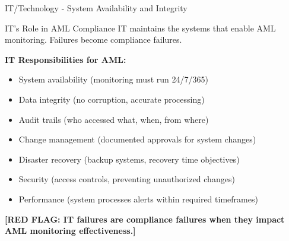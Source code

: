 \documentclass[11pt,a4paper]{beamer}
\newcommand{\redflag}[1]{\textcolor{red!80!black}{\textbf{[RED FLAG: #1]}}}
\begin{document}
	\begin{frame}{IT/Technology - System Availability and Integrity}
		\begin{block}{IT's Role in AML Compliance}
			IT maintains the systems that enable AML monitoring. Failures become compliance failures.
		\end{block}
		\textbf{IT Responsibilities for AML:}
		\begin{itemize}
			\item System availability (monitoring must run 24/7/365)
			\item Data integrity (no corruption, accurate processing)
			\item Audit trails (who accessed what, when, from where)
			\item Change management (documented approvals for system changes)
			\item Disaster recovery (backup systems, recovery time objectives)
			\item Security (access controls, preventing unauthorized changes)
			\item Performance (system processes alerts within required timeframes)
		\end{itemize}
		\redflag{IT failures are compliance failures when they impact AML monitoring effectiveness.}
	\end{frame}
	
	
\end{document}
